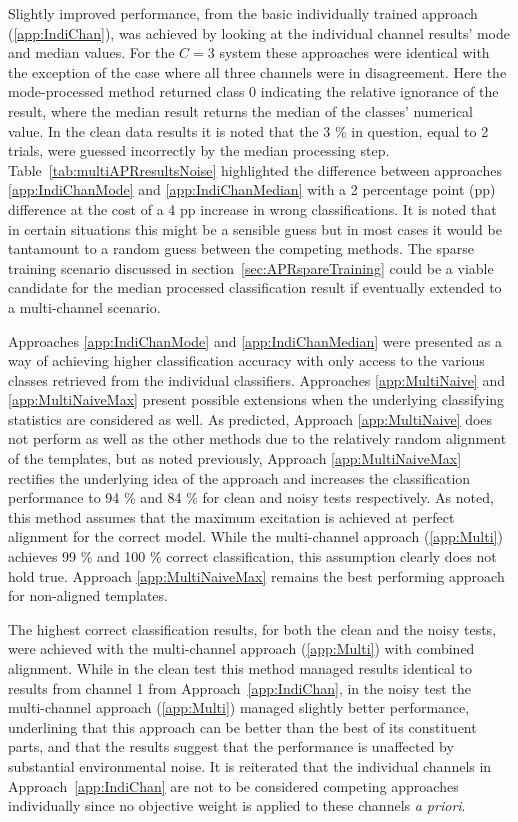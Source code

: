 Slightly improved performance, from the basic individually trained approach (\ref{app:IndiChan}), was achieved by looking at the individual channel results' mode and median values. For the $C=3$ system these approaches were identical with the exception of the case where all three channels were in disagreement. Here the mode-processed method returned class 0 indicating the relative ignorance of the result, where the median result returns the median of the classes' numerical value. In the clean data results it is noted that the 3 \% in question, equal to 2 trials, were guessed incorrectly by the median processing step. Table~\ref{tab:multiAPRresultsNoise} highlighted the difference between approaches \ref{app:IndiChanMode} and \ref{app:IndiChanMedian} with a 2 percentage point (pp) difference at the cost of a 4 pp increase in wrong classifications. It is noted that in certain situations this might be a sensible guess but in most cases it would be tantamount to a random guess between the competing methods. The sparse training scenario discussed in section~\ref{sec:APRspareTraining} could be a viable candidate for the median processed classification result if eventually extended to a multi-channel scenario.

Approaches \ref{app:IndiChanMode} and \ref{app:IndiChanMedian} were presented as a way of achieving higher classification accuracy with only access to the various classes retrieved from the individual classifiers. Approaches \ref{app:MultiNaive} and \ref{app:MultiNaiveMax} present possible extensions when the underlying classifying statistics are considered as well. As predicted, Approach \ref{app:MultiNaive} does not perform as well as the other methods due to the relatively random alignment of the templates, but as noted previously, Approach \ref{app:MultiNaiveMax} rectifies the underlying idea of the approach and increases the classification performance to 94 \% and 84 \% for clean and noisy tests respectively. As noted, this method assumes that the maximum excitation is achieved at perfect alignment for the correct model. While the multi-channel approach (\ref{app:Multi}) achieves 99 \% and 100 \% correct classification, this assumption clearly does not hold true. Approach \ref{app:MultiNaiveMax} remains the best performing approach for non-aligned templates.

The highest correct classification results, for both the clean and the noisy tests, were achieved with the multi-channel approach (\ref{app:Multi}) with combined alignment. While in the clean test this method managed results identical to results from \DIFdelbegin {}\DIFdelend channel 1 from Approach~\ref{app:IndiChan}, in the noisy test the multi-channel approach (\ref{app:Multi}) managed slightly better performance, underlining that this approach can be better than the best of its constituent parts, and that the results suggest that the performance is unaffected by substantial environmental noise. It is reiterated that the individual channels in Approach~\ref{app:IndiChan} are not to be considered competing approaches individually since no objective weight is applied to these channels \emph{a priori}.

